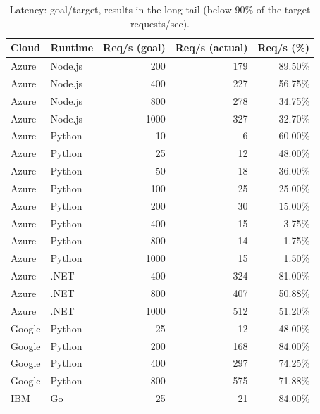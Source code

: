 
\renewcommand{\arraystretch}{1.2}
\begin{table}[!t]
\setlength{\tabcolsep}{3pt}
\scriptsize
\centering
\caption{Latency: goal/target, results in the long-tail (below 90\% of the target requests/sec).}
\begin{tabular}{l|l|r|r|r} 
\rowcolor{gray!45}
\textbf{Cloud} & \textbf{Runtime} & \textbf{Req/s (goal)} & \textbf{Req/s (actual)} & \textbf{Req/s (\%)} \\ \hline
Azure & Node.js & 200 & 179 & 89.50\% \\ 
Azure & Node.js & 400 & 227 & 56.75\% \\ 
Azure & Node.js & 800 & 278 & 34.75\% \\ 
Azure & Node.js & 1000 & 327 & 32.70\% \\
Azure & Python & 10 & 6 & 60.00\% \\  
Azure & Python & 25 & 12 & 48.00\% \\ 
Azure & Python & 50 & 18 & 36.00\% \\ 
Azure & Python & 100 & 25 & 25.00\% \\ 
Azure & Python & 200 & 30 & 15.00\% \\ 
Azure & Python & 400 & 15 & 3.75\% \\ 
Azure & Python & 800 & 14 & 1.75\% \\ 
Azure & Python & 1000 & 15 & 1.50\% \\
Azure & .NET & 400 & 324  & 81.00\% \\
Azure & .NET & 800 & 407 & 50.88\% \\ 
Azure & .NET & 1000 & 512 & 51.20\% \\ 
Google & Python & 25 & 12 & 48.00\% \\ 
Google & Python & 200 & 168 & 84.00\% \\ 
Google & Python & 400 & 297 & 74.25\% \\ 
Google & Python & 800 & 575 & 71.88\% \\ 
IBM & Go & 25 &  21 & 84.00\% \\ \hline
\end{tabular}
\label{table:rps}
\vspace{-15pt}
\end{table}

